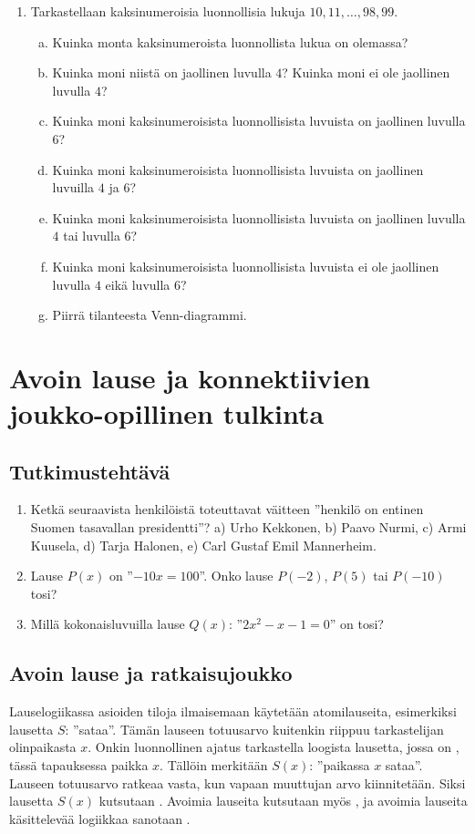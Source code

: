 \begin{enumerate}
\item Tarkastellaan kaksinumeroisia luonnollisia lukuja $10, 11, \ldots, 98, 99$.
\begin{enumerate}[a)]
\item Kuinka monta kaksinumeroista luonnollista lukua on olemassa?
\item Kuinka moni niistä on jaollinen luvulla $4$? Kuinka moni ei ole jaollinen luvulla $4$?
\item Kuinka moni kaksinumeroisista luonnollisista luvuista on jaollinen luvulla $6$?
\item Kuinka moni kaksinumeroisista luonnollisista luvuista on jaollinen luvuilla $4$ ja $6$?
\item Kuinka moni kaksinumeroisista luonnollisista luvuista on jaollinen luvulla $4$ tai luvulla $6$?
\item Kuinka moni kaksinumeroisista luonnollisista luvuista ei ole jaollinen luvulla $4$ eikä luvulla $6$?
\item Piirrä tilanteesta Venn-diagrammi.
\end{enumerate}

\end{enumerate}

\newpage


\section{Avoin lause ja konnektiivien joukko-opillinen tulkinta}

\subsection*{Tutkimustehtävä}
\begin{enumerate}
\item Ketkä seuraavista henkilöistä toteuttavat väitteen ''henkilö on entinen Suomen tasavallan presidentti''? 
a) Urho Kekkonen,  b)  Paavo Nurmi,  c)  Armi Kuusela,  d)  Tarja Halonen,  
e) Carl Gustaf Emil Mannerheim.
\item
Lause $P(x)$ on ''$-10x = 100$''. Onko lause $P(-2)$, $P(5)$ tai $P(-10)$ tosi?
\item
Millä kokonaisluvuilla lause $Q(x)$: ''$2x^2 - x - 1 = 0$'' on tosi?
\end{enumerate}

\subsection*{Avoin lause ja ratkaisujoukko}
Lauselogiikassa asioiden tiloja ilmaisemaan käytetään atomilauseita, esimerkiksi lausetta $S$: ''sataa''. Tämän lauseen totuusarvo kuitenkin riippuu tarkastelijan olinpaikasta $x$. Onkin luonnollinen ajatus tarkastella loogista lausetta, jossa on , tässä tapauksessa paikka $x$. Tällöin merkitään $S(x)$: ''paikassa $x$ sataa''. Lauseen totuusarvo ratkeaa vasta, kun vapaan muuttujan arvo kiinnitetään. Siksi lausetta $S(x)$ kutsutaan . Avoimia lauseita kutsutaan myös , ja avoimia lauseita käsittelevää logiikkaa sanotaan .

